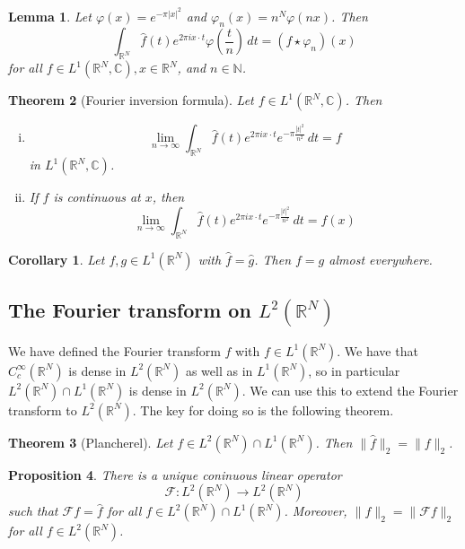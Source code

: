 \documentclass[10pt, oneside, reqno]{amsart}
\theoremstyle{plain}%
\newtheorem{thm}{Theorem}[section]
\newtheorem{lem}[thm]{Lemma}
\newtheorem{prop}[thm]{Proposition}
\newtheorem*{cor}{Corollary}
\theoremstyle{definition}
\theoremstyle{remark}
\newcommand{\R}{\mathbb{R}}
\newcommand{\Com}{\mathbb{C}}
\renewcommand{\phi}{\varphi}
\begin{document}
\begin{lem}
	Let $\phi(x) = e^{- \pi |x|^2}$ and $\phi_n(x) = n^N \phi(n x)$.  Then \[
		\int_{\R^N} \hat f (t) e^{2 \pi i x \cdot t} \phi\left(\frac{t}{n} \right) \, dt = (f \star \phi_n) (x)
	\]
	for all $f \in L^1(\R^N,\Com), x \in \R^N$, and $n \in \mathbb{N}$.
\end{lem}

\begin{thm}[Fourier inversion formula]
	Let $f \in L^1(\R^N, \Com)$. Then 
	\begin{enumerate}[(i)]
		\item \[
			\lim_{n \rightarrow \infty} \int_{\R^N} \hat f (t) e^{2 \pi i x \cdot t} e^{- \pi \frac{|t|^2}{n^2}} \, dt = f
		\] in $L^1(\R^N, \Com)$.
		\item If $f$ is continuous at $x$, then \[
			\lim_{n \rightarrow \infty} \int_{\R^N} \hat f (t) e^{2 \pi i x \cdot t} e^{- \pi \frac{|t|^2}{n^2}} \, dt = f(x)
		\]
	\end{enumerate}
\end{thm}

\begin{cor}
	Let $f,g \in L^1(\R^N)$ with $\hat f = \hat g$. Then $f = g$ almost everywhere. 
\end{cor}

\subsection{The Fourier transform on $L^2(\R^N)$} %
\label{sub:the_fourier_transform_on_l_2_r_n_}
	We have defined the Fourier transform $\hat f$ with $f \in L^1(\R^N)$.  We  have that $C_c^\infty(\R^N)$ is dense in $L^2(\R^N)$ as well as in $L^1(\R^N)$, so in particular $L^2(\R^N) \cap L^1(\R^N)$ is dense in $L^2(\R^N)$. We can use this to extend the Fourier transform to $L^2(\R^N)$.  The key for doing so is the following theorem.  
	\begin{thm}[Plancherel]
		Let $f \in L^2(\R^N) \cap L^1(\R^N)$. Then $\| \hat f \|_2 = \| f \|_2$. 
	\end{thm}

\begin{prop}
	There is a unique coninuous linear operator \[
		\mathcal{F} : L^2(\R^N) \rightarrow L^2(\R^N)
	\] such that $\mathcal{F} f = \hat f$ for all $f \in L^2(\R^N) \cap L^1(\R^N)$.  Moreover, $\| f \|_2 = \| \mathcal{F} f \|_2$ for all $f \in L^2(\R^N)$.
\end{prop}
\end{document}
